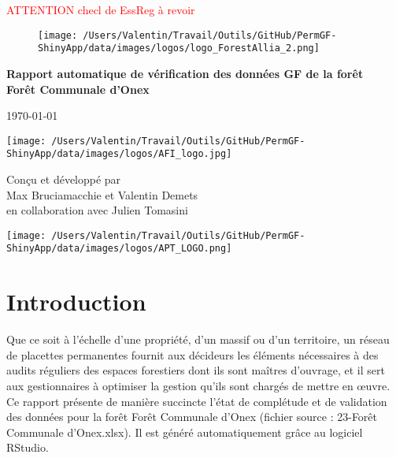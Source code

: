 \documentclass[a4paper]{article}
\begin{document}
\textcolor{red}{\Large ATTENTION checl de EssReg à revoir}

\thispagestyle{empty} %

\begin{center}

\begin{figure}[ht]
\centering

\texttt{[image: /Users/Valentin/Travail/Outils/GitHub/PermGF-ShinyApp/data/images/logos/logo\_ForestAllia\_2.png]}
\end{figure}

\vspace*{5cm}
\textbf{Rapport automatique de vérification des données GF de la forêt\\
\vspace{0,5cm}
Forêt Communale d'Onex}\\
\vspace{1cm}
\vspace{0,5cm}
\date{\year}
\end{center}

\begin{center}
\today\\
\vfill


\begin{multicols}{3}
\begin{flushleft}
\texttt{[image: /Users/Valentin/Travail/Outils/GitHub/PermGF-ShinyApp/data/images/logos/AFI\_logo.jpg]}
\end{flushleft}

\scriptsize{Conçu et développé par\\ Max Bruciamacchie et Valentin Demets\\ en collaboration avec Julien Tomasini}

\begin{flushright}
\texttt{[image: /Users/Valentin/Travail/Outils/GitHub/PermGF-ShinyApp/data/images/logos/APT\_LOGO.png]} %
\end{flushright}
\end{multicols}

\end{center}

\newpage\null\thispagestyle{empty}\newpage

\section*{Introduction}
Que ce soit à l'échelle d'une propriété, d'un massif ou d'un territoire, un réseau de placettes permanentes fournit aux décideurs les éléments nécessaires à des audits réguliers des espaces forestiers dont ils sont maîtres d'ouvrage, et il sert aux gestionnaires à optimiser la gestion qu'ils sont chargés de mettre en \oe uvre.\\
Ce rapport présente de manière succincte l'état de complétude et de validation des données pour la forêt Forêt Communale d'Onex (fichier source : 23-Forêt Communale d'Onex.xlsx). Il est généré automatiquement grâce au logiciel RStudio.
\end{document}
